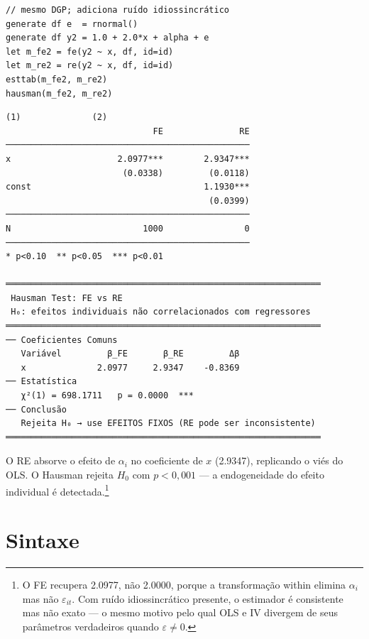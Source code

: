 \begin{lstlisting}[caption={Hausman — FE vs RE com efeito correlacionado}]
// mesmo DGP; adiciona ruído idiossincrático
generate df e  = rnormal()
generate df y2 = 1.0 + 2.0*x + alpha + e
let m_fe2 = fe(y2 ~ x, df, id=id)
let m_re2 = re(y2 ~ x, df, id=id)
esttab(m_fe2, m_re2)
hausman(m_fe2, m_re2)
\end{lstlisting}

\begin{lstlisting}[language={}, basicstyle=\ttfamily\small,
  frame=none, numbers=none, backgroundcolor=\color{codbg},
  xleftmargin=0pt, xrightmargin=0pt, breaklines=false]
                            (1)              (2)
                             FE               RE
────────────────────────────────────────────────
x                     2.0977***        2.9347***
                       (0.0338)         (0.0118)
const                                  1.1930***
                                        (0.0399)
────────────────────────────────────────────────
N                          1000                0
────────────────────────────────────────────────
* p<0.10  ** p<0.05  *** p<0.01

══════════════════════════════════════════════════════════════
 Hausman Test: FE vs RE
 H₀: efeitos individuais não correlacionados com regressores
══════════════════════════════════════════════════════════════
── Coeficientes Comuns
   Variável         β_FE       β_RE         Δβ
   x              2.0977     2.9347    -0.8369
── Estatística
   χ²(1) = 698.1711   p = 0.0000  ***
── Conclusão
   Rejeita H₀ → use EFEITOS FIXOS (RE pode ser inconsistente)
══════════════════════════════════════════════════════════════
\end{lstlisting}

O RE absorve o efeito de $\alpha_i$ no coeficiente de $x$ (2.9347), replicando
o viés do OLS. O Hausman rejeita $H_0$ com $p < 0{,}001$ — a endogeneidade
do efeito individual é detectada.\footnote{%
  O FE recupera 2.0977, não 2.0000, porque a transformação within elimina
  $\alpha_i$ mas não $\varepsilon_{it}$. Com ruído idiossincrático presente,
  o estimador é consistente mas não exato — o mesmo motivo pelo qual OLS
  e IV divergem de seus parâmetros verdadeiros quando $\varepsilon \neq 0$.}

\section{Sintaxe}

